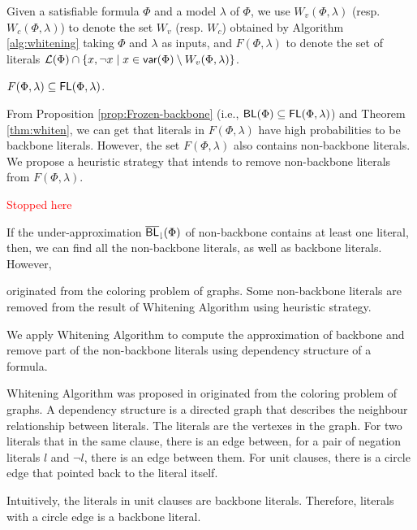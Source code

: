 Given a satisfiable formula $\Phi$ and a model $\lambda$ of $\Phi$, we use $W_v(\Phi,\lambda)$ (resp. $W_c(\Phi,\lambda)$) to denote the set
$W_v$ (resp. $W_c$) obtained by Algorithm \ref{alg:whitening} taking $\Phi$ and $\lambda$ as inputs, and
$F(\Phi,\lambda)$ to denote the set of literals ${\cal L}(\Phi)\cap \{x,\neg x\mid x\in \textsf{var}(\Phi)\setminus W_v(\Phi,\lambda)\}$.



\begin{theorem}\cite{LMZ09}
\label{thm:whiten}
$F(\Phi,\lambda)\subseteq\textsf{FL}(\Phi,\lambda)$.
\end{theorem}

From Proposition \ref{prop:Frozen-backbone} (i.e., $\textsf{BL}(\Phi)\subseteq\textsf{FL}(\Phi,\lambda)$) and Theorem \ref{thm:whiten}, 
we can get that literals in $F(\Phi,\lambda)$ have high probabilities to be backbone literals. However, the set $F(\Phi,\lambda)$ also contains non-backbone literals. We propose a heuristic strategy that intends to remove non-backbone literals from $F(\Phi,\lambda)$.

\textcolor{red}{Stopped here}




If the under-approximation ${\sf \overline{BL}_\downharpoonright}(\Phi)$ of non-backbone contains at least one literal,
then, we can find all the non-backbone literals, as well as backbone literals.
However,




 originated from the coloring problem of graphs. Some non-backbone literals are removed from the result of Whitening Algorithm using heuristic strategy.


 We apply Whitening Algorithm to compute the approximation of backbone and remove part of the non-backbone literals using dependency structure of a formula.

 Whitening Algorithm was proposed in \cite{CJG2001} originated from the coloring problem of graphs. A dependency structure is a directed graph that describes the neighbour relationship between literals. The literals are the vertexes in the graph. For two literals that in the same clause, there is an edge between, for a pair of negation literals $l$ and $\neg l$, there is an edge between them. For unit clauses, there is a circle edge that pointed back to the literal itself.

 Intuitively, the literals in unit clauses are backbone literals. Therefore, literals with a circle edge is a backbone literal.


